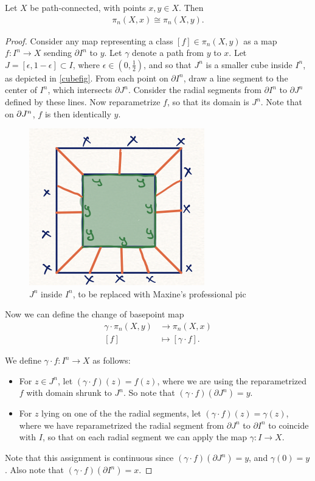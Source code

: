\documentclass{article}[11pt]
\begin{document}
\begin{proposition}\label{basepoint_dependence} Let $X$ be path-connected, with points $x,y \in X$. Then
\begin{align*}
	\pi_n(X,x) \cong \pi_n(X,y).
\end{align*}
\end{proposition}
\begin{proof} Consider any map representing a class $[f] \in \pi_n(X,y)$ as a map $f \colon I^n \to X$ sending $\partial I^n$ to $y$. Let $\gamma$ denote a path from $y$ to $x$. Let $J=[\epsilon, 1-\epsilon]\subset I$, where $\epsilon\in(0,\frac{1}{2})$, and so that $J^n$ is a smaller cube inside $I^n$, as depicted in \autoref{cubefig}. From each point on $\partial I^n$, draw a line segment to the center of $I^n$, which intersects $\partial J^n$. Consider the radial segments from $\partial I^n$ to $\partial J^n$ defined by these lines. Now reparametrize $f$, so that its domain is $J^n$. Note that on $\partial J^n$, $f$ is then identically $y$.

\begin{figure}[h]
  \includegraphics[scale=1]{pics/cubefig.png}
  \centering
  \caption{$J^n$ inside $I^n$, to be replaced with Maxine's professional pic}
  \label{cubefig}
\end{figure}

Now we can define the change of basepoint map
\begin{align*}
\gamma\cdot	\pi_n(X,y) &\to \pi_n(X,x) \\
	[f] &\mapsto [\gamma \cdot f ].
\end{align*}

We define $\gamma\cdot f\colon I^n\to X$ as follows:
\begin{itemize}\itemsep=0em
\item For $z\in J^n$, let $(\gamma\cdot f)(z)=f(z)$, where we are using the reparametrized $f$ with domain shrunk to $J^n$. So note that $(\gamma\cdot f)(\partial J^n)=y.$
\item For $z$ lying on one of the the radial segments, let $(\gamma\cdot f)(z)=\gamma(z)$, where we have reparametrized the radial segment from $\partial J^n$ to $\partial I^n$ to coincide with $I$, so that on each radial segment we can apply the map $\gamma\colon I\to X$. 
\end{itemize}
Note that this assignment is continuous since $(\gamma\cdot f)(\partial J^n)=y$, and $\gamma(0)=y$. Also note that $(\gamma\cdot f)(\partial I^n)=x$.
 

\end{proof}
\end{document}
